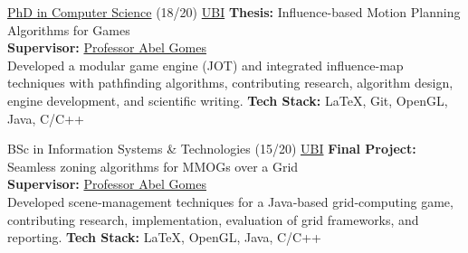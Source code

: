 \documentclass[
	a4paper,
]{fortysecondscv}
\begin{document}
\begin{cvtable}[3]

        {\textcolor{cvsectioncolor}{\href{https://www.di.ubi.pt/Cursos/dei/}{PhD in Computer Science}} (18/20)}
        {\textcolor{cvsectioncolor}{\href{https://www.ubi.pt/}{UBI}}}
        {
            \textbf{Thesis:} Influence-based Motion Planning Algorithms for Games\\
            \textbf{Supervisor:} \textcolor{cvsectioncolor}{\href{http://www.di.ubi.pt/~agomes/}{Professor Abel Gomes}}\\
            Developed a modular game engine (JOT) and integrated influence-map techniques with pathfinding algorithms, contributing research, algorithm design, engine development, and scientific writing.
            \newline \textbf{Tech Stack:}
            {\color{sklimegreen}LaTeX},
            {\color{sklimegreen}Git},
            {\color{skyellow}OpenGL},
            {\color{skyellow}Java},
            {\color{skorange}C/C++}
        }

        {BSc in Information Systems \& Technologies (15/20)\vspace{0.3em}}
        {\textcolor{cvsectioncolor}{\href{https://www.ubi.pt/}{UBI}}}
        {
            \textbf{Final Project:} Seamless zoning algorithms for MMOGs over a Grid\\
            \textbf{Supervisor:} \textcolor{cvsectioncolor}{\href{http://www.di.ubi.pt/~agomes/}{Professor Abel Gomes}}\\
            Developed scene‑management techniques for a Java‑based grid‑computing game, contributing research, implementation, evaluation of grid frameworks, and reporting.
            \newline \textbf{Tech Stack:}
            {\color{sklimegreen}LaTeX},
            {\color{skyellow}OpenGL},
            {\color{skyellow}Java},
            {\color{skorange}C/C++}
        }


\end{cvtable}
\end{document}
